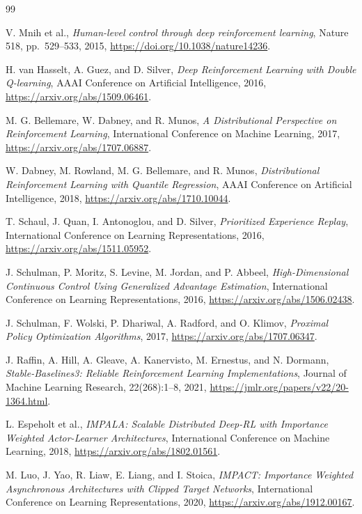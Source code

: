 \documentclass{strategynet-journal}
\begin{document}
\begin{thebibliography}{99}

V. Mnih et al.,
\emph{Human-level control through deep reinforcement learning},
Nature 518, pp.~529--533, 2015,
\url{https://doi.org/10.1038/nature14236}.

H. van Hasselt, A. Guez, and D. Silver,
\emph{Deep Reinforcement Learning with Double Q-learning},
AAAI Conference on Artificial Intelligence, 2016,
\url{https://arxiv.org/abs/1509.06461}.

M. G. Bellemare, W. Dabney, and R. Munos,
\emph{A Distributional Perspective on Reinforcement Learning},
International Conference on Machine Learning, 2017,
\url{https://arxiv.org/abs/1707.06887}.

W. Dabney, M. Rowland, M. G. Bellemare, and R. Munos,
\emph{Distributional Reinforcement Learning with Quantile Regression},
AAAI Conference on Artificial Intelligence, 2018,
\url{https://arxiv.org/abs/1710.10044}.

T. Schaul, J. Quan, I. Antonoglou, and D. Silver,
\emph{Prioritized Experience Replay},
International Conference on Learning Representations, 2016,
\url{https://arxiv.org/abs/1511.05952}.

J. Schulman, P. Moritz, S. Levine, M. Jordan, and P. Abbeel,
\emph{High-Dimensional Continuous Control Using Generalized Advantage
Estimation},
International Conference on Learning Representations, 2016,
\url{https://arxiv.org/abs/1506.02438}.

J. Schulman, F. Wolski, P. Dhariwal, A. Radford, and O. Klimov,
\emph{Proximal Policy Optimization Algorithms}, 2017,
\url{https://arxiv.org/abs/1707.06347}.

J. Raffin, A. Hill, A. Gleave, A. Kanervisto, M. Ernestus, and N. Dormann,
\emph{Stable-Baselines3: Reliable Reinforcement Learning Implementations},
Journal of Machine Learning Research, 22(268):1--8, 2021,
\url{https://jmlr.org/papers/v22/20-1364.html}.

L. Espeholt et al.,
\emph{IMPALA: Scalable Distributed Deep-RL with Importance Weighted
Actor-Learner Architectures},
International Conference on Machine Learning, 2018,
\url{https://arxiv.org/abs/1802.01561}.

M. Luo, J. Yao, R. Liaw, E. Liang, and I. Stoica,
\emph{IMPACT: Importance Weighted Asynchronous Architectures with Clipped
Target Networks},
International Conference on Learning Representations, 2020,
\url{https://arxiv.org/abs/1912.00167}.


\end{thebibliography}
\end{document}

